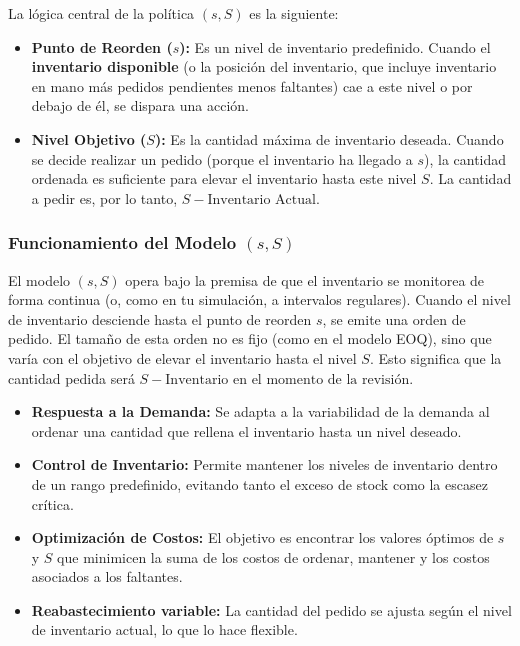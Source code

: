 \documentclass{article}
\begin{document}
La lógica central de la política $(s,S)$ es la siguiente:
\begin{itemize}
    \item \textbf{Punto de Reorden ($s$):} Es un nivel de inventario predefinido. Cuando el \textbf{inventario disponible} (o la posición del inventario, que incluye inventario en mano más pedidos pendientes menos faltantes) cae a este nivel o por debajo de él, se dispara una acción.
    \item \textbf{Nivel Objetivo ($S$):} Es la cantidad máxima de inventario deseada. Cuando se decide realizar un pedido (porque el inventario ha llegado a $s$), la cantidad ordenada es suficiente para elevar el inventario hasta este nivel $S$. La cantidad a pedir es, por lo tanto, $S - \text{Inventario Actual}$.
\end{itemize}


\subsubsection{Funcionamiento del Modelo $(s,S)$}
El modelo $(s,S)$ opera bajo la premisa de que el inventario se monitorea de forma continua (o, como en tu simulación, a intervalos regulares). Cuando el nivel de inventario desciende hasta el punto de reorden $s$, se emite una orden de pedido. El tamaño de esta orden no es fijo (como en el modelo EOQ), sino que varía con el objetivo de elevar el inventario hasta el nivel $S$. Esto significa que la cantidad pedida será $S - \text{Inventario en el momento de la revisión}$.


\begin{itemize}
    \item \textbf{Respuesta a la Demanda:} Se adapta a la variabilidad de la demanda al ordenar una cantidad que rellena el inventario hasta un nivel deseado.
    \item \textbf{Control de Inventario:} Permite mantener los niveles de inventario dentro de un rango predefinido, evitando tanto el exceso de stock como la escasez crítica.
    \item \textbf{Optimización de Costos:} El objetivo es encontrar los valores óptimos de $s$ y $S$ que minimicen la suma de los costos de ordenar, mantener y los costos asociados a los faltantes.
\item \textbf{Reabastecimiento variable:} La cantidad del pedido se ajusta según el nivel de inventario actual, lo que lo hace flexible.
\end{itemize}
\end{document}
